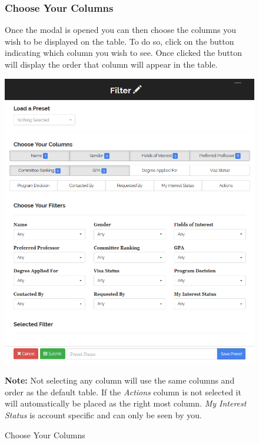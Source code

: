 \documentclass[fontsize=12pt,paper=letter,twoside]{scrartcl}
\begin{document}
\clearpage
\begin{figure}[!htb]
\subsubsection{Choose Your Columns}
Once the modal is opened you can then choose the columns you wish to be displayed on the table. To do so, click on the button indicating which column you wish to see. Once clicked the button will display the order that column will appear in the table.\begin{center}
\includegraphics[width=.99\textwidth]{images/prof/choose_columns.png}
\end{center}
\caption{Choose Your Columns}
\label{fig:prof/choose_columns}
\textbf{Note:} Not selecting any column will use the same columns and order as the default table. If the \emph{Actions} column is not selected it will automatically be placed as the right most column. \emph{My Interest Status} is account specific and can only be seen by you.
\end{figure}

\clearpage
\end{document}
